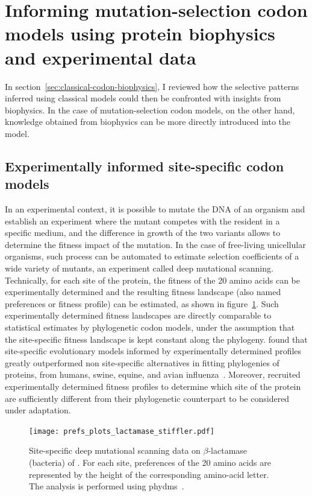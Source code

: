 \section{Informing mutation-selection codon models using protein biophysics and experimental data}
\label{sec:mechanistic-codon-biophysics}

In section~\ref{sec:classical-codon-biophysics}, I reviewed how the selective patterns inferred using classical models could then be confronted with insights from biophysics.
In the case of mutation-selection codon models, on the other hand, knowledge obtained from biophysics can be more directly introduced into the model.

\subsection{Experimentally informed site-specific codon models}

In an experimental context, it is possible to mutate the \acrshort{DNA} of an organism and establish an experiment where the mutant competes with the resident in a specific medium, and the difference in growth of the two variants allows to determine the fitness impact of the mutation.
In the case of free-living unicellular organisms, such process can be automated to estimate selection coefficients of a wide variety of mutants, an experiment called deep mutational scanning.
Technically, for each site of the protein, the fitness of the 20 amino acids can be experimentally determined and the resulting fitness landscape (also named preferences or fitness profile) can be estimated, as shown in figure~\ref{fig:intro-deep-mut-profile}.
Such experimentally determined fitness landscapes are directly comparable to statistical estimates by phylogenetic codon models, under the assumption that the site-specific fitness landscape is kept constant along the phylogeny.
\citet{Bloom2014,Bloom2014a} found that site-specific evolutionary models informed by experimentally determined profiles greatly outperformed non site-specific alternatives in fitting phylogenies of proteins, from humans, swine, equine, and avian influenza~\citep{Doud2015}.
Moreover, \citet{Bloom2017} recruited experimentally determined fitness profiles to determine which site of the protein are sufficiently different from their phylogenetic counterpart to be considered under adaptation.

\begin{figure}[htbp]
    \centering
    \texttt{[image: prefs\_plots\_lactamase\_stiffler.pdf]}
    \caption[Deep mutational scanning profile]{
    Site-specific deep mutational scanning data on $\beta$-lactamase (bacteria) of \citet{Stiffler2015}.
    For each site, preferences of the 20 amino acids are represented by the height of the corresponding amino-acid letter.
    The analysis is performed using phydms~\citep{Hilton2017}.}
    \label{fig:intro-deep-mut-profile}
\end{figure}

